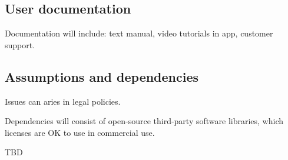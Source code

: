 \documentclass{article}
\begin{document}
\subsection{User documentation}

Documentation will include: text manual, video tutorials in app, customer support.

\subsection{Assumptions and dependencies}
Issues can aries in legal policies.

Dependencies will consist of open-source third-party software libraries, which licenses are OK to use in commercial use.

TBD

\end{document}
